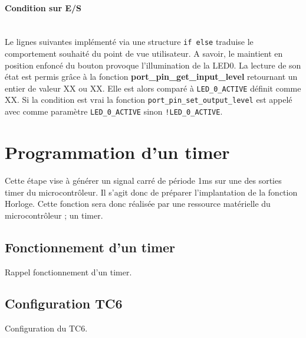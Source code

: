 \documentclass[a4paper]{article}
\begin{document}
\paragraph{Condition sur E/S}
~~\\
Le lignes suivantes implémenté via une structure \texttt{if else} traduise le comportement souhaité du point de vue utilisateur. A savoir, le maintient en position enfoncé du bouton provoque l'illumination de la LED0. La lecture de son état est permis grâce à la fonction \textbf{port\_pin\_get\_input\_level} retournant un entier de valeur XX ou XX. Elle est alors comparé à \texttt{LED\_0\_ACTIVE} définit comme XX. Si la condition est vrai la fonction \texttt{port\_pin\_set\_output\_level} est appelé avec comme paramètre \texttt{LED\_0\_ACTIVE} sinon \texttt{!LED\_0\_ACTIVE}.

\section{Programmation d'un timer}
Cette étape vise à générer un signal carré de période 1ms sur une des sorties timer du microcontrôleur. Il s'agit donc de préparer l'implantation de la fonction Horloge. Cette fonction sera donc réalisée par une ressource matérielle du microcontrôleur ; un timer.
\subsection{Fonctionnement d'un timer}
Rappel fonctionnement d'un timer.
\subsection{Configuration TC6}
Configuration du TC6.



{}

\end{document}
